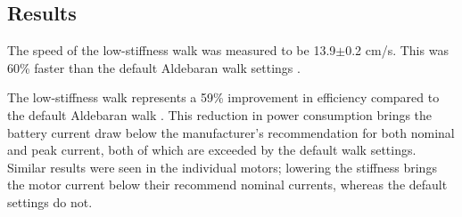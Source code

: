 \subsection{Results}
The speed of the low-stiffness walk was measured to be 13.9$\pm$0.2 cm/s. This was 60\% faster than the default Aldebaran walk settings \cite{youtubewalkvideo1}.

The low-stiffness walk represents a 59\% improvement in efficiency compared to the default Aldebaran walk \cite{JasonsAcraPaper}. This reduction in power consumption brings the battery current draw below the manufacturer's recommendation for both nominal and peak current, both of which are exceeded by the default walk settings. Similar results were seen in the individual motors; lowering the stiffness brings the motor current below their recommend nominal currents, whereas the default settings do not.


%
%
%
%
%
%
